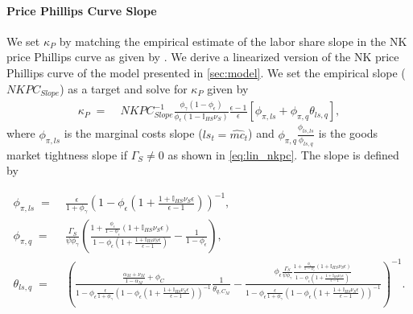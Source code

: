 \documentclass[12pt,3p,authoryear,review]{elsarticle}
\begin{document}
\begin{small}
\paragraph{Price Phillips Curve Slope}%
We set $\kappa_P$ by matching the empirical estimate of the labor share slope in the NK price Phillips curve as given by \cite{galiInflationDynamicsStructural1999}. We derive a linearized version of the NK price Phillips curve of the model presented in \cref{sec:model}. We set the empirical slope ($NKPC_{Slope}$) as a target and solve for $\kappa_P$ given by%
\begin{align}%
	\kappa_P \; = & \; NKPC_{Slope}^{-1} \frac{\phi_\gamma\left(1-\phi_\epsilon\right)}{\phi_\epsilon\left(1-\mathbb{I}_{HS}\nu_S\right)} \frac{\epsilon-1}{\epsilon} \left[ \phi_{\pi,ls} + \phi_{\pi,q} \theta_{ls,q} \right],\label{eq:add_kapP_slope}%
\end{align}%
where $\phi_{\pi,ls}$ is the marginal costs slope ($\hat{ls}_t = \hat{mc}_t$) and $\phi_{\pi,q} \frac{\phi_{ls,ls}}{\phi_{ls,q}}$ is the goods market tightness slope if $\Gamma_S \neq 0$ as shown in \eqref{eq:lin_nkpc}. The slope is defined by%
\begin{footnotesize}%
	\begin{align*}%
		\phi_{\pi,ls} \; = & \; \frac{\epsilon}{1+\phi_\gamma} \left(1-\phi_\epsilon\left(1+\frac{1+\mathbb{I}_{HS}\nu_S\epsilon}{\epsilon-1}\right)\right)^{-1},\\%
		\phi_{\pi,q} \; = & \; \frac{\Gamma_S}{\psi \phi_\gamma} \left( \frac{1+\frac{\phi_\epsilon}{1-\phi_\epsilon}\left(1+\mathbb{I}_{HS}\nu_S\epsilon\right)}{1-\phi_\epsilon\left(1+\frac{1+\mathbb{I}_{HS}\nu_S\epsilon}{\epsilon-1}\right)} - \frac{1}{1-\phi_\epsilon} \right),\\%
		\theta_{ls,q} \; = & \; \left( \frac{\frac{\alpha_M+\nu_M}{1-\alpha_M}+\phi_C}{1-\phi_\epsilon\frac{\epsilon}{1+\phi_\gamma}\left(1-\phi_\epsilon\left(1+\frac{1+\mathbb{I}_{HS}\nu_S\epsilon}{\epsilon-1}\right)\right)^{-1}} \frac{1}{\theta_{q,C_M}} - \frac{\phi_\epsilon\frac{\Gamma_S}{\psi\phi_\gamma}\frac{1+\frac{\phi_\epsilon}{1-\phi_\epsilon}\left(1+\mathbb{I}_{HS}\nu_S\epsilon\right)}{1-\phi_\epsilon\left(1+\frac{1+\mathbb{I}_{HS}\nu_S\epsilon}{\epsilon-1}\right)}}{1-\phi_\epsilon\frac{\epsilon}{1+\phi_\gamma}\left(1-\phi_\epsilon\left(1+\frac{1+\mathbb{I}_{HS}\nu_S\epsilon}{\epsilon-1}\right)\right)^{-1}} \right)^{-1}.%
	\end{align*}%
\end{footnotesize}%

\end{small}
\end{document}
